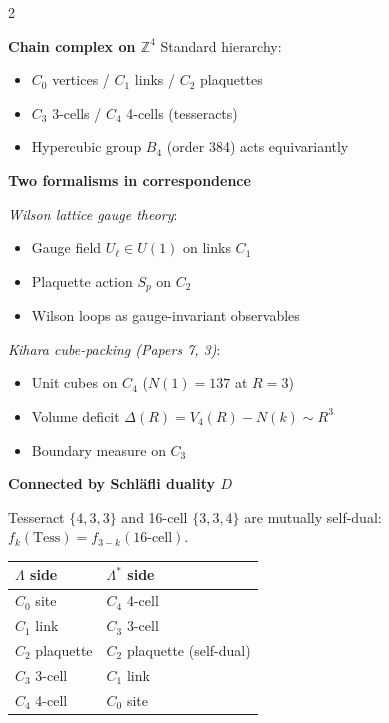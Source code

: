 \documentclass[9pt,a4paper]{article}
\begin{document}
\begin{multicols}{2}
\small

\textbf{Chain complex on $\mathbb{Z}^4$}\enspace
Standard hierarchy:
\begin{itemize}[topsep=1pt]
\item $C_0$ vertices / $C_1$ links / $C_2$ plaquettes
\item $C_3$ 3-cells / $C_4$ 4-cells (tesseracts)
\item Hypercubic group $B_4$ (order 384) acts equivariantly
\end{itemize}

\smallskip
\textbf{Two formalisms in correspondence}\enspace

\textit{Wilson lattice gauge theory}:
\begin{itemize}[topsep=1pt]
\item Gauge field $U_\ell \in U(1)$ on links $C_1$
\item Plaquette action $S_p$ on $C_2$
\item Wilson loops as gauge-invariant observables
\end{itemize}

\textit{Kihara cube-packing (Papers 7, 3)}:
\begin{itemize}[topsep=1pt]
\item Unit cubes on $C_4$ ($N(1)=137$ at $R=3$)
\item Volume deficit $\Delta(R) = V_4(R) - N(k) \sim R^3$
\item Boundary measure on $C_3$
\end{itemize}

\smallskip
\textbf{Connected by Schl\"afli duality $D$}\enspace

Tesseract $\{4,3,3\}$ and 16-cell $\{3,3,4\}$ are mutually self-dual: $f_k(\text{Tess}) = f_{3-k}(\text{16-cell})$.

\vspace{1pt}
{\footnotesize
\begin{tabular}{@{}ll@{}}
\toprule
$\Lambda$ side & $\Lambda^*$ side \\
\midrule
$C_0$ site & $C_4$ 4-cell \\
$C_1$ link & $C_3$ 3-cell \\
$C_2$ plaquette & $C_2$ plaquette (self-dual) \\
$C_3$ 3-cell & $C_1$ link \\
$C_4$ 4-cell & $C_0$ site \\
\bottomrule
\end{tabular}
}


\end{multicols}
\end{document}
